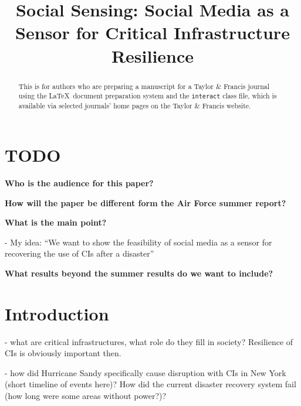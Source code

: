 \documentclass[]{interact}
\theoremstyle{plain}%
\theoremstyle{definition}
\theoremstyle{remark}
\begin{document}

    \title{Social Sensing: Social Media as a Sensor for Critical Infrastructure Resilience}

    \author{
    }

    \maketitle

    \begin{abstract}
    This is for authors who are preparing a manuscript for a Taylor \& Francis journal using the \LaTeX\ document preparation system and the \texttt{interact} class file, which is available via selected journals' home pages on the Taylor \& Francis website.
    \end{abstract}

    \section{TODO}
    \textbf{Who is the audience for this paper?}

    \textbf{How will the paper be different form the Air Force summer report?}


    \textbf{What is the main point?}

    - My idea: “We want to show the feasibility of social media as a sensor for recovering the use of CIs after a disaster”

    \textbf{What results beyond the summer results do we want to include?}


    \section{Introduction}

    - what are critical infrastructures, what role do they fill in society?  Resilience of CIs is obviously important then.

    - how did Hurricane Sandy specifically cause disruption with CIs in New York (short timeline of events here)?  How did the current disaster recovery system fail (how long were some areas without power?)?
\end{document}
